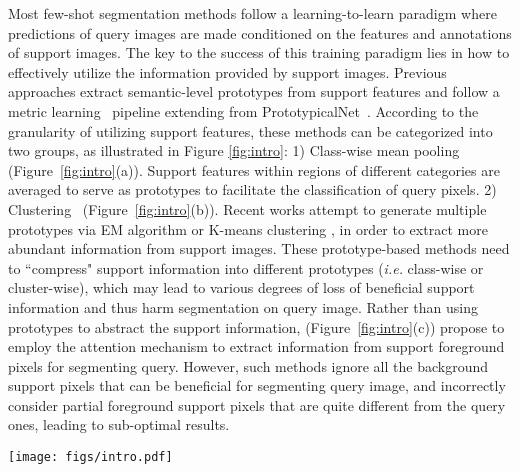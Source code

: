 \documentclass{article}
\begin{document}
Most few-shot segmentation methods follow a learning-to-learn paradigm where predictions of query images are made conditioned on the features and annotations of support images.
The key to the success of this training paradigm lies in how to effectively utilize the information provided by support images. 
Previous approaches extract semantic-level prototypes from support features and follow a metric learning~\cite{sung2018relationnet,dong2018FSSPL,wang2019panet} pipeline extending from PrototypicalNet~\cite{snell2017prototypical}. 
According to the granularity of utilizing support features, these methods can be categorized into two groups, as illustrated in Figure \ref{fig:intro}: 
1) Class-wise mean pooling~\cite{wang2019panet,zhang2020sgone,zhang2019canet} (Figure~\ref{fig:intro}(a)). Support features within regions of different categories are averaged to serve as prototypes to facilitate the classification of query pixels. 
2) Clustering~\cite{liu2020ppnet,yang2020PMM} (Figure~\ref{fig:intro}(b)). Recent works attempt to generate multiple prototypes via EM algorithm or K-means clustering \cite{yang2020PMM,liu2020ppnet}, 
in order to extract more abundant information from support images. 
These prototype-based methods need to ``compress" support information into different prototypes (\emph{i.e.} class-wise or cluster-wise), 
which may lead to various degrees of loss of beneficial support information and thus harm segmentation on query image. 
Rather than using prototypes to abstract the support information, \cite{zhang2019pgnet,cao2020dan} (Figure~\ref{fig:intro}(c)) propose to employ the attention mechanism to extract information from support foreground pixels for segmenting query.
However, such methods ignore all the background support pixels that can be beneficial for segmenting query image, and incorrectly consider partial foreground support pixels that are quite different from the query ones, leading to sub-optimal results.  



\begin{figure*}[t]
    \centering
    \texttt{[image: figs/intro.pdf]}
    \caption{Different learning frameworks for few-shot segmentation, from the perspective of ways to utilize support information. (a) Class-wise mean pooling based method. (b) Clustering based method. (c) Foreground pixel attention method. (d) Our Cycle-Consistent TRansformer (CyCTR) framework that enables all beneficial support pixel-level features (foreground and background) to be considered.}
    \label{fig:intro}
\end{figure*}
\end{document}
